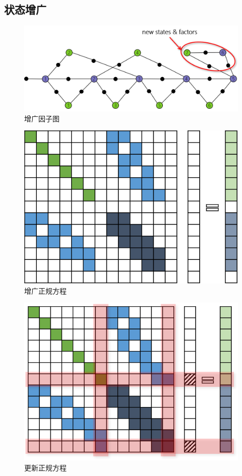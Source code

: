 \subsection{状态增广}

\begin{figure}[htb]
    \centering
    \includegraphics[width=\textwidth]{figs/factor_graph_aug.png}
    \caption{增广因子图}
\end{figure}

\begin{figure}[htb]
    \centering
    \includegraphics{figs/normal_eq_aug.png}
    \caption{增广正规方程}
\end{figure}

\begin{figure}[htb]
    \centering
    \includegraphics{figs/normal_eq_update.png}
    \caption{更新正规方程}
\end{figure}

